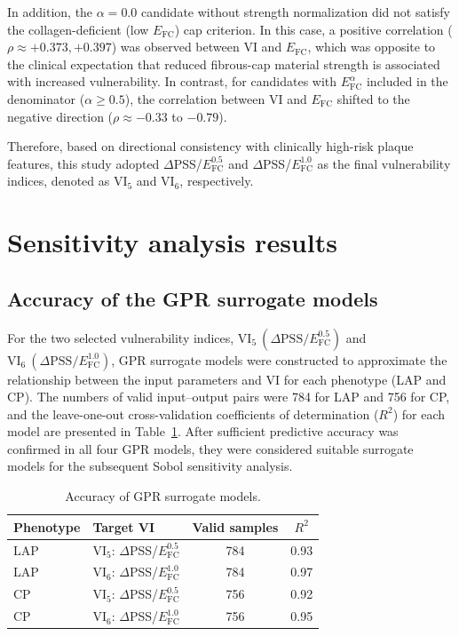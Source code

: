 \documentclass[master,english,final]{kaist-ucs}
\begin{document}
In addition, the $\alpha=0.0$ candidate without strength normalization did not satisfy the collagen-deficient (low $E_\mathrm{FC}$) cap criterion. In this case, a positive correlation ($\rho \approx +0.373, +0.397$) was observed between VI and $E_\mathrm{FC}$, which was opposite to the clinical expectation that reduced fibrous-cap material strength is associated with increased vulnerability. In contrast, for candidates with $E_\mathrm{FC}^{\alpha}$ included in the denominator ($\alpha \geq 0.5$), the correlation between VI and $E_\mathrm{FC}$ shifted to the negative direction ($\rho \approx -0.33$ to $-0.79$).

Therefore, based on directional consistency with clinically high-risk plaque features, this study adopted $\Delta$PSS/$E_\mathrm{FC}^{0.5}$ and $\Delta$PSS/$E_\mathrm{FC}^{1.0}$ as the final vulnerability indices, denoted as $\mathrm{VI}_5$ and $\mathrm{VI}_6$, respectively.

\section{Sensitivity analysis results}
\subsection{Accuracy of the GPR surrogate models}
For the two selected vulnerability indices, $\mathrm{VI}_5\ (\Delta\mathrm{PSS}/E_\mathrm{FC}^{0.5})$ and $\mathrm{VI}_6\ (\Delta\mathrm{PSS}/E_\mathrm{FC}^{1.0})$, GPR surrogate models were constructed to approximate the relationship between the input parameters and VI for each phenotype (LAP and CP). The numbers of valid input--output pairs were 784 for LAP and 756 for CP, and the leave-one-out cross-validation coefficients of determination ($R^2$) for each model are presented in Table~\ref{tab:gpr-accuracy}. After sufficient predictive accuracy was confirmed in all four GPR models, they were considered suitable surrogate models for the subsequent Sobol sensitivity analysis.

\begin{table}[ht]
\caption[GPR surrogate accuracy]{Accuracy of GPR surrogate models.}
\label{tab:gpr-accuracy}
\begin{center}
\begin{tabular}{llcc}
\hline\hline
Phenotype & Target VI & Valid samples & $R^2$ \\
\hline
LAP & $\mathrm{VI}_5$: $\Delta$PSS/$E_\mathrm{FC}^{0.5}$ & 784 & 0.93 \\
LAP & $\mathrm{VI}_6$: $\Delta$PSS/$E_\mathrm{FC}^{1.0}$ & 784 & 0.97 \\
CP  & $\mathrm{VI}_5$: $\Delta$PSS/$E_\mathrm{FC}^{0.5}$ & 756 & 0.92 \\
CP  & $\mathrm{VI}_6$: $\Delta$PSS/$E_\mathrm{FC}^{1.0}$ & 756 & 0.95 \\
\hline\hline
\end{tabular}
\end{center}
\end{table}
\end{document}
